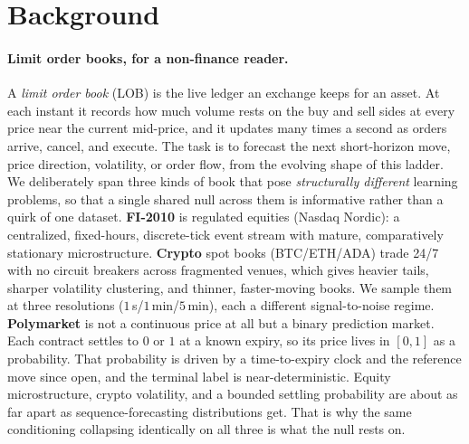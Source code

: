 \documentclass{article}
\begin{document}
\section{Background}\label{sec:background}
\paragraph{Limit order books, for a non-finance reader.} A \emph{limit order book} (LOB) is the live ledger an exchange keeps for an asset. At each instant it records how much volume rests on the buy and sell sides at every price near the current mid-price, and it updates many times a second as orders arrive, cancel, and execute. The task is to forecast the next short-horizon move, price direction, volatility, or order flow, from the evolving shape of this ladder. We deliberately span three kinds of book that pose \emph{structurally different} learning problems, so that a single shared null across them is informative rather than a quirk of one dataset. \textbf{FI-2010} is regulated equities (Nasdaq Nordic): a centralized, fixed-hours, discrete-tick event stream with mature, comparatively stationary microstructure. \textbf{Crypto} spot books (BTC/ETH/ADA) trade 24/7 with no circuit breakers across fragmented venues, which gives heavier tails, sharper volatility clustering, and thinner, faster-moving books. We sample them at three resolutions ($1\,$s/$1\,$min/$5\,$min), each a different signal-to-noise regime. \textbf{Polymarket} is not a continuous price at all but a binary prediction market. Each contract settles to $0$ or $1$ at a known expiry, so its price lives in $[0,1]$ as a probability. That probability is driven by a time-to-expiry clock and the reference move since open, and the terminal label is near-deterministic. Equity microstructure, crypto volatility, and a bounded settling probability are about as far apart as sequence-forecasting distributions get. That is why the same conditioning collapsing identically on all three is what the null rests on.
\end{document}
